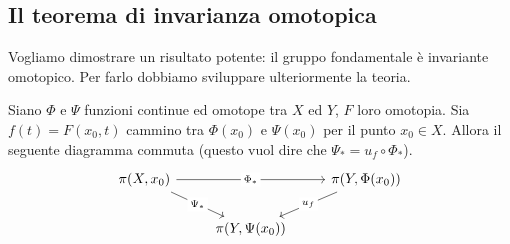 \subsection{\textcolor{TopAlg}{\textbf{Il teorema di invarianza omotopica}}}
Vogliamo dimostrare un risultato potente: il gruppo fondamentale è invariante omotopico. Per farlo dobbiamo sviluppare ulteriormente la teoria.
\begin{lemma}
	Siano $\Phi$ e $\Psi$ funzioni continue ed omotope tra $X$ ed $Y$, $F$ loro omotopia. Sia $f(t)=F(x_0,t)$ cammino tra $\Phi(x_0)$ e $\Psi(x_0)$ per il punto $x_0\in X$. Allora il seguente diagramma commuta (questo vuol dire che $\Psi_*=u_f\circ \Phi_*$).
	\begin{equation*}
	\begin{tikzcd}
	{\pi(X,x_0)} \arrow[rd, "\Psi_*" description] \arrow[rr, "\Phi_*" description] &                    & {\pi(Y,\Phi(x_0))} \arrow[ld, "u_f" description] \\
	& {\pi(Y,\Psi(x_0))} &                                                 
	\end{tikzcd}
	\end{equation*}
\end{lemma}
